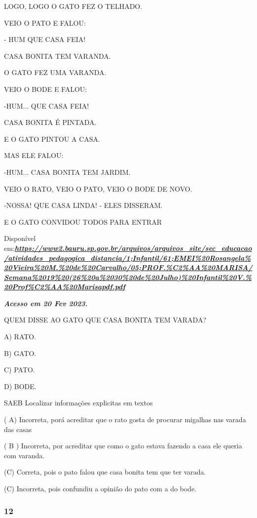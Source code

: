 \begin{escola}
LOGO, LOGO O GATO FEZ O TELHADO.

VEIO O PATO E FALOU:

- HUM QUE CASA FEIA!

CASA BONITA TEM VARANDA.

O GATO FEZ UMA VARANDA.

VEIO O BODE E FALOU:

-HUM... QUE CASA FEIA!

CASA BONITA É PINTADA.

E O GATO PINTOU A CASA.

MAS ELE FALOU:

-HUM... CASA BONITA TEM JARDIM.

VEIO O RATO, VEIO O PATO, VEIO O BODE DE NOVO.

-NOSSA! QUE CASA LINDA! - ELES DISSERAM.

E O GATO CONVIDOU TODOS PARA ENTRAR

Disponível
em:\href{https://www2.bauru.sp.gov.br/arquivos/arquivos_site/sec_educacao/atividades_pedagogica_distancia/1;Infantil/61;EMEI\%20Rosangela\%20Vieira\%20M.\%20de\%20Carvalho/05;PROF.\%C2\%AA\%20MARISA/Semana\%2019\%20(26\%20a\%2030\%20de\%20Julho)\%20Infantil\%20V.\%20Prof\%C2\%AA\%20Marisapdf.pdf}{\textbf{\emph{https://www2.bauru.sp.gov.br/arquivos/arquivos\_site/sec\_educacao/atividades\_pedagogica\_distancia/1;Infantil/61;EMEI\%20Rosangela\%20Vieira\%20M.\%20de\%20Carvalho/05;PROF.\%C2\%AA\%20MARISA/Semana\%2019\%20(26\%20a\%2030\%20de\%20Julho)\%20Infantil\%20V.\%20Prof\%C2\%AA\%20Marisapdf.pdf}}}

\textbf{\emph{Acesso em 20 Fev 2023.}}

QUEM DISSE AO GATO QUE CASA BONITA TEM VARADA?

A) RATO.

B) GATO.

C) PATO.

D) BODE.

\protect\hypertarget{_heading=h.28h4qwu}{}{}SAEB Localizar informações
explicitas em textos

( A) Incorreta, porá acreditar que o rato gosta de procurar migalhas nas
varada das casas

( B ) Incorreta, por acreditar que como o gato estava fazendo a casa ele
queria com varanda.

(C) Correta, pois o pato falou que casa bonita tem que ter varada.

(C) Incorreta, pois confundiu a opinião do pato com a do bode.

\subsubsection{12}\label{section-52}


\end{escola}
